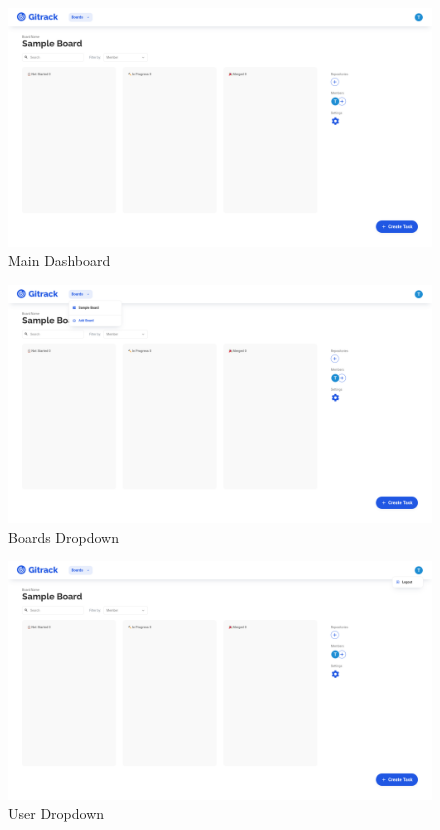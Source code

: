 \documentclass{article}
\begin{document}
\begin{figure}[H]
	\includegraphics[width=1\textwidth]{board}\par\vspace{0.5cm}
	\caption{Main Dashboard}
	\label{fig:board}
\end{figure}

\begin{figure}[H]
	\includegraphics[width=1\textwidth]{board-dropdown}\par\vspace{0.5cm}
	\caption{Boards Dropdown}
	\label{fig:board-dropdown}
\end{figure}

\begin{figure}[H]
	\includegraphics[width=1\textwidth]{board-user}\par\vspace{0.5cm}
	\caption{User Dropdown}
	\label{fig:board-user}
\end{figure}
\end{document}
